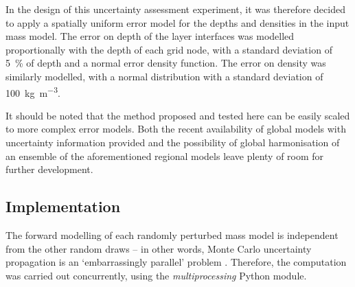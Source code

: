 In the design of this uncertainty assessment experiment, it was therefore decided to apply a spatially uniform error model for the depths and densities in the input mass model.
The error on depth of the layer interfaces was modelled proportionally with the depth of each grid node, with a standard deviation of \SI{5}{\percent} of depth and a normal error density function.
The error on density was similarly modelled, with a normal distribution with a standard deviation of \SI{100}{\kilo \gram \per \cubic \metre}.



It should be noted that the method proposed and tested here can be easily scaled to more complex error models.
Both the recent availability of global models with uncertainty information provided \parencite[e.g.][]{Szwillus2019} and the possibility of global harmonisation of an ensemble of the aforementioned regional models leave plenty of room for further development.

\subsection{Implementation}
\label{ss:SigIs:Impl:Impl}

The forward modelling of each randomly perturbed mass model is independent from the other random draws -- in other words, Monte Carlo uncertainty propagation is an `embarrassingly parallel' problem \parencite[see e.g.][chapter 15]{Kontoghiorghes2005}.
Therefore, the computation was carried out concurrently, using the \textit{multiprocessing} Python module.

